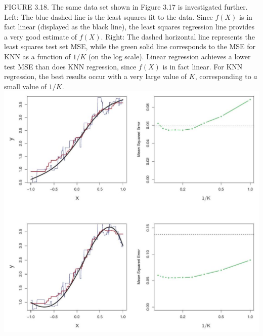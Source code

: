\documentclass[10pt]{article}
\begin{document}
FIGURE 3.18. The same data set shown in Figure 3.17 is investigated further. Left: The blue dashed line is the least squares fit to the data. Since $f(X)$ is in fact linear (displayed as the black line), the least squares regression line provides a very good estimate of $f(X)$. Right: The dashed horizontal line represents the least squares test set MSE, while the green solid line corresponds to the MSE for KNN as a function of $1 / K$ (on the log scale). Linear regression achieves a lower test MSE than does KNN regression, since $f(X)$ is in fact linear. For KNN regression, the best results occur with a very large value of $K$, corresponding to $a$ small value of $1 / K$.\\
\includegraphics[max width=\textwidth, center]{2025_05_05_efe77898333945044de4g-123}
\end{document}
